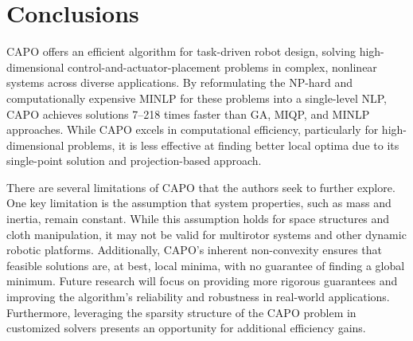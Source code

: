 \documentclass[runningheads]{llncs}
\begin{document}
\section{Conclusions}
\label{sec:conclusions}
\vspace{-25pt}
CAPO offers an efficient algorithm for task-driven robot design, solving high-dimensional control-and-actuator-placement problems in complex, nonlinear systems across diverse applications. By reformulating the NP-hard and computationally expensive MINLP for these problems into a single-level NLP, CAPO achieves solutions 7–218 times faster than GA, MIQP, and MINLP approaches. While CAPO excels in computational efficiency, particularly for high-dimensional problems, it is less effective at finding better local optima due to its single-point solution and projection-based approach.

There are several limitations of CAPO that the authors seek to further explore. One key limitation is the assumption that system properties, such as mass and inertia, remain constant. While this assumption holds for space structures and cloth manipulation, it may not be valid for multirotor systems and other dynamic robotic platforms. Additionally, CAPO's inherent non-convexity ensures that feasible solutions are, at best, local minima, with no guarantee of finding a global minimum. Future research will focus on providing more rigorous guarantees and improving the algorithm's reliability and robustness in real-world applications. Furthermore, leveraging the sparsity structure of the CAPO problem in customized solvers presents an opportunity for additional efficiency gains.

\end{document}
